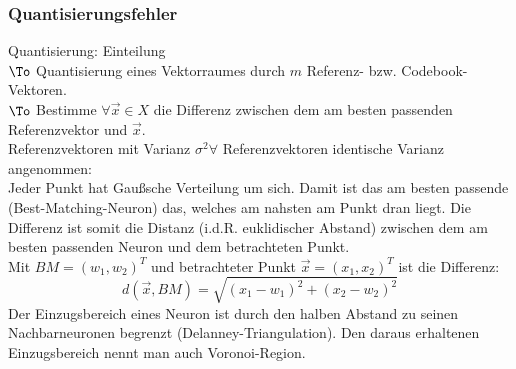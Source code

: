 \subsubsection{Quantisierungsfehler}
Quantisierung: Einteilung\\
$\To$ Quantisierung eines Vektorraumes durch $m$ Referenz- bzw. Codebook-Vektoren.\\
$\To$ Bestimme $\forall \vec{x} \in X$ die Differenz zwischen dem am besten passenden Referenzvektor und $\vec{x}$.\\
Referenzvektoren mit Varianz $\sigma^2 \forall$ Referenzvektoren identische Varianz angenommen:\\
Jeder Punkt hat Gaußsche Verteilung um sich. Damit ist das am besten passende (Best-Matching-Neuron) das, welches am nahsten am Punkt dran liegt. Die Differenz ist somit die Distanz (i.d.R. euklidischer Abstand) zwischen dem am besten passenden Neuron und dem betrachteten Punkt. \\
Mit $BM=(w_1,w_2)^T$ und betrachteter Punkt $\vec{x}=(x_1,x_2)^T$ ist die Differenz:
$$d(\vec{x}, BM)=\sqrt{(x_1-w_1)^2+(x_2-w_2)^2}$$
Der Einzugsbereich eines Neuron ist durch den halben Abstand zu seinen Nachbarneuronen begrenzt (Delanney-Triangulation). Den daraus erhaltenen Einzugsbereich nennt man auch Voronoi-Region.


